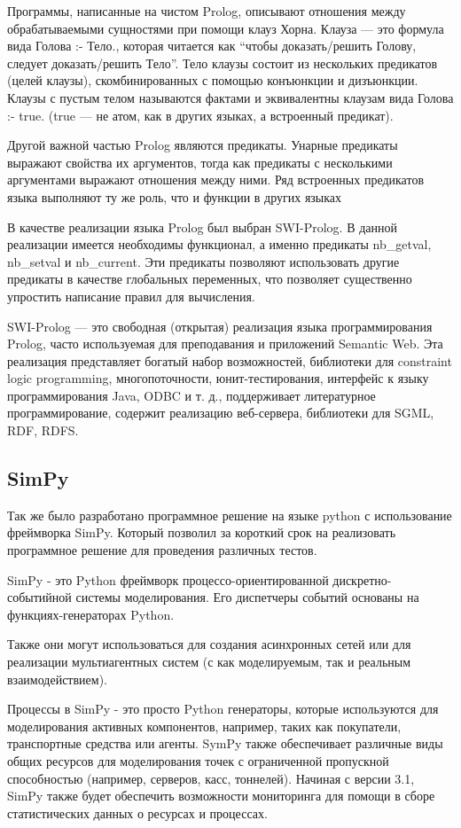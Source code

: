 		Программы, написанные на чистом Prolog, описывают отношения между обрабатываемыми сущностями при помощи клауз Хорна. Клауза — это формула вида Голова :- Тело., которая читается как “чтобы доказать/решить Голову, следует доказать/решить Тело”. Тело клаузы состоит из нескольких предикатов (целей клаузы), скомбинированных с помощью конъюнкции и дизъюнкции. Клаузы с пустым телом называются фактами и эквивалентны клаузам вида Голова :- true. (true — не атом, как в других языках, а встроенный предикат).

		Другой важной частью Prolog являются предикаты. Унарные предикаты выражают свойства их аргументов, тогда как предикаты с несколькими аргументами выражают отношения между ними. Ряд встроенных предикатов языка выполняют ту же роль, что и функции в других языках

		В качестве реализации языка Prolog был выбран SWI-Prolog.
			В данной реализации имеется необходимы функционал, а именно предикаты nb\_getval, nb\_setval и nb\_current.
			Эти предикаты позволяют использовать другие предикаты в качестве глобальных переменных, что
			позволяет существенно упростить написание правил для вычисления.

		SWI-Prolog — это свободная (открытая) реализация языка программирования Prolog, часто используемая для преподавания и приложений Semantic Web. Эта реализация представляет богатый набор возможностей, библиотеки для constraint logic programming, многопоточности, юнит-тестирования, интерфейс к языку программирования Java, ODBC и т. д., поддерживает литературное программирование, содержит реализацию веб-сервера, библиотеки для SGML, RDF, RDFS.

\subsection{SimPy}

	Так же было разработано программное решение на языке python с использование фреймворка SimPy.
		Который позволил за короткий срок на реализовать программное решение для проведения различных тестов.  

	SimPy - это Python фреймворк процессо-ориентированной дискретно-событийной системы моделирования. Его диспетчеры событий основаны на функциях-генераторах Python.

	Также они могут использоваться для создания асинхронных сетей или для реализации мультиагентных систем (с как моделируемым, так и реальным взаимодействием).

	Процессы в SimPy - это просто Python генераторы, которые используются для моделирования активных компонентов, например, таких как покупатели, транспортные средства или агенты. SymPy также обеспечивает различные виды общих ресурсов для моделирования точек с ограниченной пропускной способностью (например, серверов, касс, тоннелей). Начиная с версии 3.1, SimPy также будет обеспечить возможности мониторинга для помощи в сборе статистических данных о ресурсах и процессах. 

